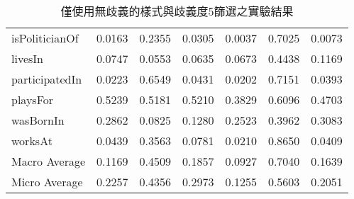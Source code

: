 \begin{table}
\begin{center}
\begin{tabular}{|l||c|c|c||c|c|c|}
        isPoliticianOf & 0.0163 & 0.2355 & 0.0305 & 0.0037 & 0.7025 & 0.0073 \\
        livesIn & 0.0747 & 0.0553 & 0.0635 & 0.0673 & 0.4438 & 0.1169 \\
        participatedIn & 0.0223 & 0.6549 & 0.0431 & 0.0202 & 0.7151 & 0.0393 \\
        playsFor & 0.5239 & 0.5181 & 0.5210 & 0.3829 & 0.6096 & 0.4703 \\
        wasBornIn & 0.2862 & 0.0825 & 0.1280 & 0.2523 & 0.3962 & 0.3083 \\
        worksAt & 0.0439 & 0.3563 & 0.0781 & 0.0210 & 0.8650 & 0.0409 \\ 
        \hline
        Macro Average & 0.1169 & 0.4509 & 0.1857 & 0.0927 & 0.7040 & 0.1639 \\
        Micro Average & 0.2257 & 0.4356 & 0.2973 & 0.1255 & 0.5603 & 0.2051 \\
        \hline
        \end{tabular}
        \caption{僅使用無歧義的樣式與歧義度5篩選之實驗結果}
        \label{t:baseline-1}
    \end{center}
\end{table}
